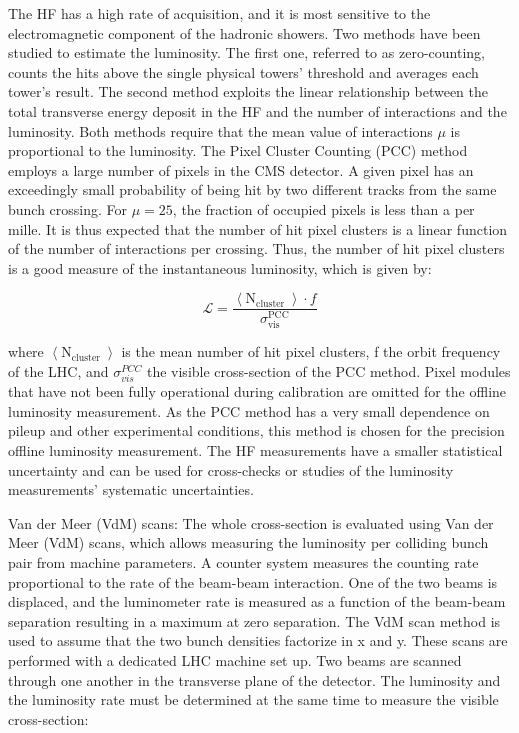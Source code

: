 The HF has a high rate of acquisition, and it is most sensitive to the electromagnetic component of the hadronic showers. Two methods have been studied to estimate the luminosity. The first one, referred to as zero-counting, counts the hits above the single physical towers' threshold and averages each tower's result. The second method exploits the linear relationship between the total transverse energy deposit in the HF and the number of interactions and the luminosity. Both methods require that the mean value of interactions $\mu$ is proportional to the luminosity. The Pixel Cluster Counting (PCC) method employs a large number of pixels in the CMS detector. A given pixel has an exceedingly small probability of being hit by two different tracks from the same bunch crossing. For $\mu = 25$, the fraction of occupied pixels is less than a per mille. It is thus expected that the number of hit pixel clusters is a linear function of the number of interactions per crossing. Thus, the number of hit pixel clusters is a good measure of the instantaneous luminosity, which is given by:

\begin{equation}
  \mathcal{L}=\frac{\left\langle\mathrm{N}_{\text {cluster }}\right\rangle \cdot f}{\sigma_{\mathrm{vis}}^{\mathrm{PCC}}}
\end{equation}

where $\left\langle\mathrm{N}_{\text {cluster }}\right\rangle$ is the mean number of hit pixel clusters, f the orbit frequency of the LHC, and $\sigma_{vis}^{PCC}$ the visible cross-section of the PCC method. Pixel modules that have not been fully operational during calibration are omitted for the offline luminosity measurement. As the PCC method has a very small dependence on pileup and other experimental conditions, this method is chosen for the precision offline luminosity measurement. The HF measurements have a smaller statistical uncertainty and can be used for cross-checks or studies of the luminosity measurements' systematic uncertainties.

Van der Meer (VdM) scans: The whole cross-section is evaluated using Van der Meer (VdM) scans, which allows measuring the luminosity per colliding bunch pair from machine parameters. A counter system measures the counting rate proportional to the rate of the beam-beam interaction. One of the two beams is displaced, and the luminometer rate is measured as a function of the beam-beam separation resulting in a maximum at zero separation. The VdM scan method is used to assume that the two bunch densities factorize in x and y. These scans are performed with a dedicated LHC machine set up. Two beams are scanned through one another in the transverse plane of the detector. The luminosity and the luminosity rate must be determined at the same time to measure the visible cross-section:

